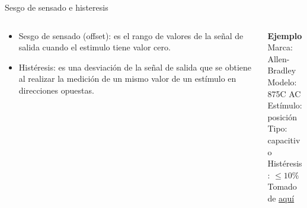 \documentclass[aspectratio=169]{beamer}
\begin{document}
\begin{frame}{Sesgo de sensado e histeresis}
    \begin{columns}[c, onlytextwidth]
        \begin{column}{0.50\textwidth}
            \begin{itemize}
                \item Sesgo de sensado (offset): es el rango de valores de la señal de salida cuando el estimulo tiene valor cero. 
                \item Histéresis: es una desviación de la señal de salida  que se obtiene al realizar la medición de un mismo valor de un estímulo en direcciones opuestas.
            \end{itemize}
        \end{column}
        \begin{column}{0.45\textwidth}
            \textbf{Ejemplo}\\[4pt]
            Marca: Allen-Bradley\\[4pt]
            Modelo: 875C AC\\[4pt]
            Estímulo: posición\\[4pt]
            Tipo: capacitivo\\[4pt]
            Histéresis: $\leq 10 \%$\\[10pt]
            \tiny{Tomado de \href{https://literature.rockwellautomation.com/idc/groups/literature/documents/td/875-td001_-en-p.pdf}{aquí}}
        \end{column}
    \end{columns}
\end{frame}
\end{document}

